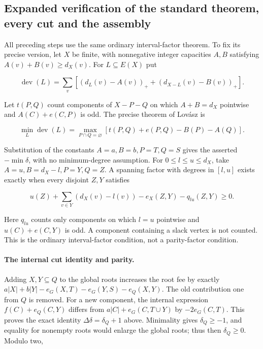 \documentclass[11pt,a4paper]{article}
\theoremstyle{definition}
\begin{document}
\subsection{Expanded verification of the standard theorem, every cut and the assembly}
All preceding steps use the same ordinary interval-factor theorem. To fix its precise version, let $X$ be finite, with nonnegative integer capacities $A,B$ satisfying $A(v)+B(v)\ge d_X(v)$. For $L\subseteq E(X)$ put

\[
 \operatorname{dev}(L)=\sum_v[(d_L(v)-A(v))_++(d_{X-L}(v)-B(v))_+].
\]

Let $t(P,Q)$ count components of $X-P-Q$ on which $A+B=d_X$ pointwise and $A(C)+e(C,P)$ is odd. The precise theorem of Lovász \cite[Theorem 7.3]{lovasz} is

\begin{equation}\label{eq:factor-deviation-exact}
 \min_L\operatorname{dev}(L)=\max_{P\cap Q=\varnothing}
 [t(P,Q)+e(P,Q)-B(P)-A(Q)].
\end{equation}

Substitution of the constants $A=a,B=b,P=T,Q=S$ gives the asserted $-\min\delta$, with no minimum-degree assumption. For $0\le l\le u\le d_X$, take $A=u,B=d_X-l,P=Y,Q=Z$. A spanning factor with degrees in $[l,u]$ exists exactly when every disjoint $Z,Y$ satisfies

\begin{equation}\label{eq:factor-interval-exact}
 u(Z)+\sum_{v\in Y}(d_X(v)-l(v))-e_X(Z,Y)-q_{lu}(Z,Y)\ge0.
\end{equation}

Here $q_{lu}$ counts only components on which $l=u$ pointwise and $u(C)+e(C,Y)$ is odd. A component containing a slack vertex is not counted. This is the ordinary interval-factor condition, not a parity-factor condition.

\paragraph{The internal cut identity and parity.}
Adding $X,Y\subseteq Q$ to the global roots increases the root fee by exactly
$a|X|+b|Y|-e_G(X,T)-e_G(Y,S)-e_Q(X,Y)$. The old contribution one from $Q$ is removed. For a new component, the internal expression $f(C)+e_Q(C,Y)$ differs from $a|C|+e_G(C,T\cup Y)$ by $-2e_G(C,T)$. This proves the exact identity $\Delta\delta=\delta_Q+1$ above. Minimality gives $\delta_Q\ge-1$, and equality for nonempty roots would enlarge the global roots; thus then $\delta_Q\ge0$. Modulo two,
\end{document}
